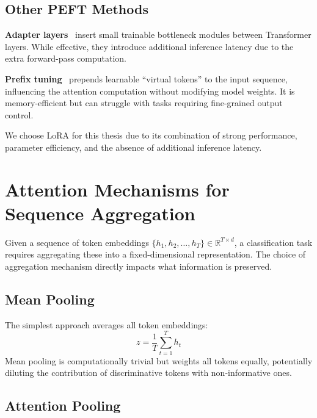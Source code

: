 \subsection{Other PEFT Methods}

\textbf{Adapter layers}~\cite{Houlsby2019} insert small trainable bottleneck modules between Transformer layers. While effective, they introduce additional inference latency due to the extra forward-pass computation.

\textbf{Prefix tuning}~\cite{Li2021} prepends learnable ``virtual tokens'' to the input sequence, influencing the attention computation without modifying model weights. It is memory-efficient but can struggle with tasks requiring fine-grained output control.

We choose LoRA for this thesis due to its combination of strong performance, parameter efficiency, and the absence of additional inference latency.

\section{Attention Mechanisms for Sequence Aggregation}
\label{sec:bg-attention}

Given a sequence of token embeddings $\{h_1, h_2, \ldots, h_T\} \in \mathbb{R}^{T \times d}$, a classification task requires aggregating these into a fixed-dimensional representation. The choice of aggregation mechanism directly impacts what information is preserved.

\subsection{Mean Pooling}

The simplest approach averages all token embeddings:
\begin{equation}
    z = \frac{1}{T} \sum_{t=1}^{T} h_t
\end{equation}
Mean pooling is computationally trivial but weights all tokens equally, potentially diluting the contribution of discriminative tokens with non-informative ones.

\subsection{Attention Pooling}

